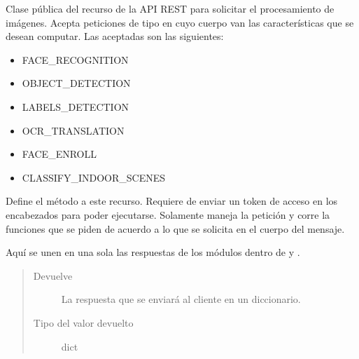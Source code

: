 \label{\detokenize{chapter_two/desc_cloudnao:module-app.resources.vision}}\label{\detokenize{chapter_two/desc_cloudnao:module-vision}}

\begin{fulllineitems}
\label{\detokenize{chapter_two/desc_cloudnao:app.resources.vision.Vision}}
Clase pública del recurso de la API REST para solicitar el procesamiento
de imágenes. Acepta peticiones de tipo  en cuyo cuerpo van las
características que se desean computar. Las aceptadas son las siguientes:
\begin{itemize}
\item {} 
FACE\_RECOGNITION

\item {} 
OBJECT\_DETECTION

\item {} 
LABELS\_DETECTION

\item {} 
OCR\_TRANSLATION

\item {} 
FACE\_ENROLL

\item {} 
CLASSIFY\_INDOOR\_SCENES

\end{itemize}

\begin{fulllineitems}
\label{\detokenize{chapter_two/desc_cloudnao:app.resources.vision.Vision.post}}
Define el método  a este recurso. Requiere de enviar un token
de acceso en los encabezados para poder ejecutarse. Solamente maneja la
petición y corre la funciones que se piden de acuerdo a lo que se
solicita en el cuerpo del mensaje.

Aquí se unen en una sola las respuestas de los módulos dentro de
 y .
\begin{quote}\begin{description}
\item[{Devuelve}] \leavevmode
La respuesta que se enviará al cliente en un diccionario.

\item[{Tipo del valor devuelto}] \leavevmode
dict

\end{description}\end{quote}

\end{fulllineitems}


\end{fulllineitems}


